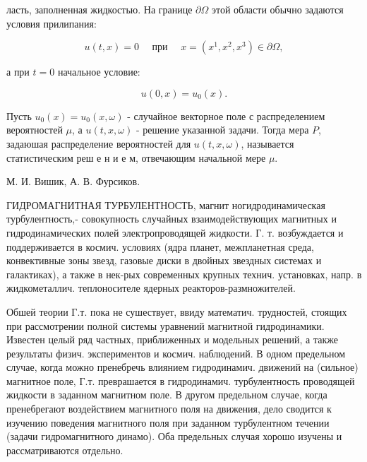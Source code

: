 \documentclass[10pt]{article}
\begin{document}
ласть, заполненная жидкостью. На границе $\partial \Omega$ этой области обычно задаются условия прилипания:



\[

u(t, x)=0 \quad \text { при } \quad x=\left(x^{1}, x^{2}, x^{3}\right) \in \partial \Omega,

\]



а при $t=0$ начальное условие:



\[

u(0, x)=u_{0}(x) .

\]



Пусть $u_{0}(x)=u_{0}(x, \omega)$ - случайное векторное поле с распределением вероятностей $\mu$, а $u(t, x, \omega)$ - решение указанной задачи. Тогда мера $P$, задаюшая распределение вероятностей для $u(t, x, \omega)$, называется статистическим реш е н и е м, отвечающим начальной мере $\mu$.



М. И. Вишик, А. В. Фурсиков.



ГИДРОМАГНИТНАЯ ТУРБУЛЕНТНОСТЬ, магнит ногидродинамическая турбулентность,- совокупность случайных взаимодействующих магнитных и гидродинамических полей электропроводящей жидкости. Г. т. возбуждается и поддерживается в космич. условиях (ядра планет, межпланетная среда, конвективные зоны звезд, газовые диски в двойных звездных системах и галактиках), а также в нек-рых современных крупных технич. установках, напр. в жидкометаллич. теплоносителе ядерных реакторов-размножителей.



Обшей теории Г.т. пока не сушествует, ввиду математич. трудностей, стоящих при рассмотрении полной системы уравнений магнитной гидродинамики. Известен целый ряд частных, приближенных и модельных решений, а также результаты физич. экспериментов и космич. наблюдений. В одном предельном случае, когда можно пренебречь влиянием гидродинамич. движений на (сильное) магнитное поле, Г.т. преврашается в гидродинамич. турбулентность проводящей жидкости в заданном магнитном поле. В другом предельном случае, когда пренебрегают воздействием магнитного поля на движения, дело сводится к изучению поведения магнитного поля при заданном турбулентном течении (задачи гидромагнитного динамо). Оба предельных случая хорошо изучены и рассматриваются отдельно.
\end{document}
